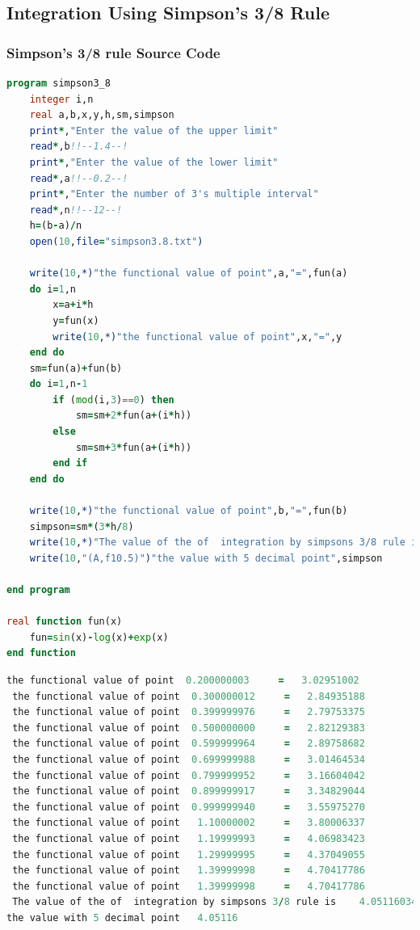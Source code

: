 \documentclass{article}
\begin{document}
\subsection{Integration Using Simpson's 3/8 Rule}
\subsubsection{Simpson's 3/8 rule Source Code}
\begin{lstlisting}[language=Fortran,caption=Simpson's 3/8 rule]
program simpson3_8
    integer i,n
    real a,b,x,y,h,sm,simpson
    print*,"Enter the value of the upper limit"
    read*,b!!--1.4--!
    print*,"Enter the value of the lower limit"
    read*,a!!--0.2--!
    print*,"Enter the number of 3's multiple interval"
    read*,n!!--12--!
    h=(b-a)/n
    open(10,file="simpson3.8.txt")

    write(10,*)"the functional value of point",a,"=",fun(a)
    do i=1,n
        x=a+i*h
        y=fun(x)
        write(10,*)"the functional value of point",x,"=",y
    end do
    sm=fun(a)+fun(b)
    do i=1,n-1
        if (mod(i,3)==0) then
            sm=sm+2*fun(a+(i*h))
        else
            sm=sm+3*fun(a+(i*h))
        end if
    end do

    write(10,*)"the functional value of point",b,"=",fun(b)
    simpson=sm*(3*h/8)
    write(10,*)"The value of the of  integration by simpsons 3/8 rule is ",simpson
    write(10,"(A,f10.5)")"the value with 5 decimal point",simpson

end program

real function fun(x)
    fun=sin(x)-log(x)+exp(x)
end function

\end{lstlisting}
\begin{lstlisting}[language=Fortran,caption= Simpson's 3/8 rule Output]
 the functional value of point  0.200000003     =   3.02951002    
 the functional value of point  0.300000012     =   2.84935188    
 the functional value of point  0.399999976     =   2.79753375    
 the functional value of point  0.500000000     =   2.82129383    
 the functional value of point  0.599999964     =   2.89758682    
 the functional value of point  0.699999988     =   3.01464534    
 the functional value of point  0.799999952     =   3.16604042    
 the functional value of point  0.899999917     =   3.34829044    
 the functional value of point  0.999999940     =   3.55975270    
 the functional value of point   1.10000002     =   3.80006337    
 the functional value of point   1.19999993     =   4.06983423    
 the functional value of point   1.29999995     =   4.37049055    
 the functional value of point   1.39999998     =   4.70417786    
 the functional value of point   1.39999998     =   4.70417786    
 The value of the of  integration by simpsons 3/8 rule is    4.05116034    
the value with 5 decimal point   4.05116


 
\end{lstlisting}
\end{document}
